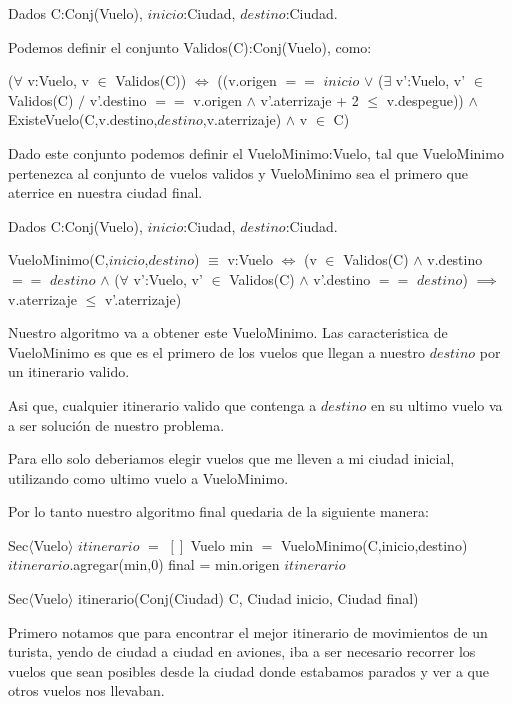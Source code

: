 Dados C:Conj(Vuelo), $inicio$:Ciudad, $destino$:Ciudad.

Podemos definir el conjunto Validos(C):Conj(Vuelo), como:

($\forall$ v:Vuelo, v $\in$ Validos(C)) $\Leftrightarrow$ ((v.origen $==$ $inicio$ $\vee$ ($\exists$ v':Vuelo, v' $\in$ Validos(C) $/$ v'.destino $==$ v.origen $\wedge$ v'.aterrizaje + 2 $\leq$ v.despegue)) $\wedge$ ExisteVuelo(C,v.destino,$destino$,v.aterrizaje) $\wedge$ v $\in$ C)

Dado este conjunto podemos definir el VueloMinimo:Vuelo, tal que VueloMinimo pertenezca al conjunto de vuelos validos y VueloMinimo sea el primero que aterrice en nuestra ciudad final.

Dados C:Conj(Vuelo), $inicio$:Ciudad, $destino$:Ciudad.

VueloMinimo(C,$inicio$,$destino$) $\equiv$ v:Vuelo $\Leftrightarrow$ (v $\in$ Validos(C) $\wedge$ v.destino $==$ $destino$ $\wedge$ ($\forall$ v':Vuelo, v' $\in$ Validos(C) $\wedge$ v'.destino $==$ $destino$) $\implies$ v.aterrizaje $\leq$ v'.aterrizaje)

Nuestro algoritmo va a obtener este VueloMinimo. Las caracteristica de VueloMinimo es que es el primero de los vuelos que llegan a nuestro $destino$ por un itinerario valido.

Asi que, cualquier itinerario valido que contenga a $destino$ en su ultimo vuelo va a ser soluci\'on de nuestro problema.

Para ello solo deberiamos elegir vuelos que me lleven a mi ciudad inicial, utilizando como ultimo vuelo a VueloMinimo.

Por lo tanto nuestro algoritmo final quedaria de la siguiente manera:

\begin{algorithm}[H]
\begin{algorithmic}[1]
\STATE Sec$\langle$Vuelo$\rangle$ $itinerario$ $=$ $[]$
	\STATE Vuelo min $=$ VueloMinimo(C,inicio,destino)
	\STATE $itinerario$.agregar(min,0)
	\STATE final = min.origen
\ENDWHILE
\RETURN $itinerario$
\caption{Sec$\langle$Vuelo$\rangle$ itinerario(Conj(Ciudad) C, Ciudad inicio, Ciudad final)}%
\end{algorithmic}
\end{algorithm}

Primero notamos que para encontrar el mejor itinerario de movimientos de un turista, yendo de ciudad a ciudad en aviones, iba a ser necesario recorrer los vuelos que sean posibles desde la ciudad donde estabamos parados y ver a que otros vuelos nos llevaban. 

